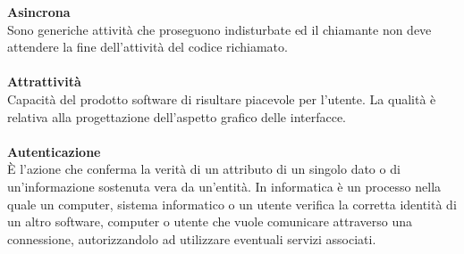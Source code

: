 \textbf{Asincrona}\\
Sono generiche attività che proseguono indisturbate ed il chiamante non deve attendere la fine dell'attività del codice richiamato. \\ \\
\textbf{Attrattività}\\
Capacità del prodotto software di risultare piacevole per l'utente. La qualità è relativa alla progettazione dell'aspetto grafico delle interfacce.\\ \\
\textbf{Autenticazione}\\
È l’azione che conferma la verità di un attributo di un singolo dato o di un’informazione sostenuta vera da un’entità. In informatica è un processo nella quale un computer, sistema informatico o un utente verifica la corretta identità di un altro software, computer o utente che vuole comunicare attraverso una connessione, autorizzandolo  ad utilizzare eventuali servizi associati. \\ \\
\clearpage